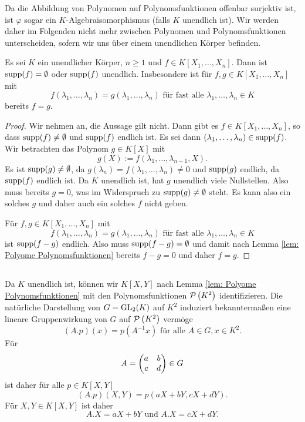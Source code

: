 \documentclass[a4paper,10pt]{article}
\begin{document}
Da die Abbildung von Polynomen auf Polynomsfunktionen offenbar surjektiv ist, ist $\varphi$ sogar ein $K$-Algebraisomorphismus (falls $K$ unendlich ist). Wir werden daher im Folgenden nicht mehr zwischen Polynomen und Polynomsfunktionen unterscheiden, sofern wir uns über einem unendlichen Körper befinden.


\begin{bem}\label{bem: support leer oder unendlich}
 Es sei $K$ ein unendlicher Körper, $n \geq 1$ und $f \in K[X_1, \ldots, X_n]$. Dann ist $\operatorname{supp}(f) = \emptyset$ oder $\operatorname{supp}(f)$ unendlich. Insbesondere ist für $f, g \in K[X_1, \ldots, X_n]$ mit
 \[
  f(\lambda_1, \ldots, \lambda_n) = g(\lambda_1, \ldots, \lambda_n) \text{ für fast alle } \lambda_1, \ldots, \lambda_n \in K
 \]
 bereits $f = g$.
\end{bem}
\begin{proof}
 Wir nehmen an, die Aussage gilt nicht. Dann gibt es $f \in K[X_1, \ldots, X_n]$, so dass $\operatorname{supp}(f) \neq \emptyset$ und $\operatorname{supp}(f)$ endlich ist. Es sei dann $(\lambda_1, \ldots, \lambda_n) \in \operatorname{supp}(f)$. Wir betrachten das Polynom $g \in K[X]$ mit
 \[
  g(X) := f(\lambda_1, \ldots, \lambda_{n-1}, X).
 \]
 Es ist $\operatorname{supp}(g) \neq \emptyset$, da $g(\lambda_n) = f(\lambda_1, \ldots, \lambda_n) \neq 0$ und $\operatorname{supp}(g)$ endlich, da $\operatorname{supp}(f)$ endlich ist. Da $K$ unendlich ist, hat $g$ unendlich viele Nullstellen. Also muss bereits $g = 0$, was im Widerspruch zu $\operatorname{supp}(g) \neq \emptyset$ steht. Es kann also ein solches $g$ und daher auch ein solches $f$ nicht geben.
 
 Für $f,g \in K[X_1, \ldots, X_n]$ mit
 \[
  f(\lambda_1, \ldots, \lambda_n) = g(\lambda_1, \ldots, \lambda_n) \text{ für fast alle } \lambda_1, \ldots, \lambda_n \in K
 \]
 ist $\operatorname{supp}(f-g)$ endlich. Also muss $\operatorname{supp}(f-g) = \emptyset$ und damit nach Lemma \ref{lem: Polyome Polynomsfunktionen} bereits $f-g = 0$ und daher $f=g$.
\end{proof}


\subsection{}
Da $K$ unendlich ist, können wir $K[X,Y]$ nach Lemma \ref{lem: Polyome Polynomsfunktionen} mit den Polynomsfunktionen $\mathcal{P}\left(K^2\right)$ identifizieren. Die natürliche Darstellung von $G = \operatorname{GL}_2(K)$ auf $K^2$ induziert bekanntermaßen eine lineare Gruppenwirkung von $G$ auf $\mathcal{P}\left(K^2\right)$ vermöge
\[
 (A.p)(x) = p\left(A^{-1}x\right) \text{ für alle } A \in G, x \in K^2.
\]
Für
\[
 A = \begin{pmatrix}a&b\\c&d\end{pmatrix} \in G
\]
ist daher für alle $p \in K[X,Y]$
\[
 (A.p)(X,Y) = p(aX+bY,cX+dY).
\]
Für $X,Y \in K[X,Y]$ ist daher
\[
 A.X = aX+bY \text{ und } A.X = cX+dY.
\]
\end{document}
